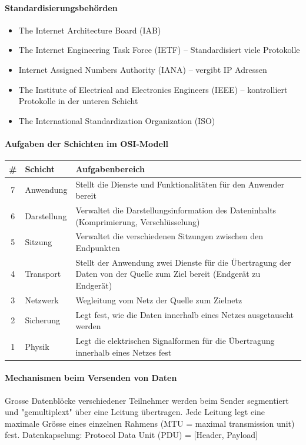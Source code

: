 \documentclass[a4paper,12pt]{article}
\begin{document}
\paragraph{Standardisierungsbehörden}
\begin{itemize}
\item The Internet Architecture Board (IAB)
\item The Internet Engineering Task Force (IETF) -- Standardisiert viele Protokolle
\item Internet Assigned Numbers Authority (IANA) -- vergibt IP Adressen
\item The Institute of Electrical and Electronics Engineers (IEEE) -- kontrolliert Protokolle in der unteren Schicht
\item The International Standardization Organization (ISO)
\end{itemize}


\paragraph{Aufgaben der Schichten im OSI-Modell}


\begin{center}
\begin{tabular}{|c| m{1.9cm} |m{7.5cm}| } 
\#&Schicht & Aufgabenbereich\\ 
\hline
7 & Anwendung & Stellt die Dienste und Funktionalitäten für den Anwender bereit\\
6 & Darstellung & Verwaltet die Darstellungsinformation des Dateninhalts (Komprimierung, Verschlüsselung)\\
5 & Sitzung & Verwaltet die verschiedenen Sitzungen zwischen den Endpunkten\\
4 &Transport & Stellt der Anwendung zwei Dienste für die Übertragung der Daten von der Quelle zum Ziel bereit (Endgerät zu Endgerät)\\
3 & Netzwerk & Wegleitung vom Netz der Quelle zum Zielnetz \\
2 & Sicherung & Legt fest, wie die Daten innerhalb eines Netzes ausgetauscht werden\\
1 & Physik & Legt die elektrischen Signalformen für die Übertragung innerhalb eines Netzes fest\\
\end{tabular}
\end{center}

\newpage
\paragraph{Mechanismen beim Versenden von Daten}
Grosse Datenblöcke verschiedener Teilnehmer werden beim Sender segmentiert und "gemultiplext" über eine Leitung übertragen. Jede Leitung legt eine maximale Grösse eines einzelnen Rahmens (MTU = maximal transmission unit) fest. Datenkapselung: Protocol Data Unit (PDU) = [Header, Payload]
\end{document}
